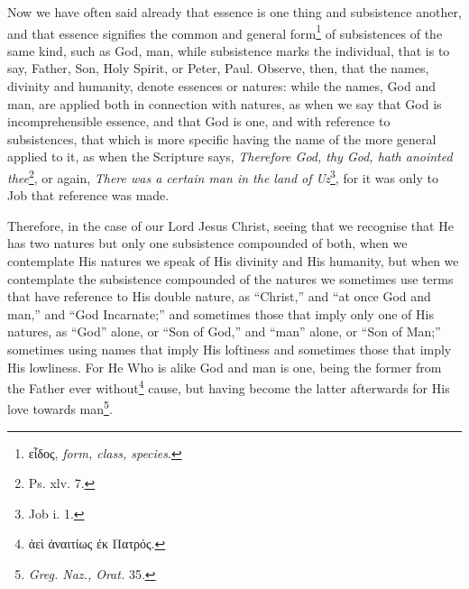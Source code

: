 Now we have often said already that essence is one thing and subsistence another, and that essence signifies the common and general form\footnote{\textgreek{εἶδος}, \emph{form, class, species}.} of subsistences of the same kind, such as God, man, while subsistence marks the individual, that is to say, Father, Son, Holy Spirit, or Peter, Paul. Observe, then, that the names, divinity and humanity, denote essences or natures: while the names, God and man, are applied both in connection with natures, as when we say that God is incomprehensible essence, and that God is one, and with reference to subsistences, that which is more specific having the name of the more general applied to it, as when the Scripture says, \emph{Therefore God, thy God, hath anointed thee}\footnote{Ps. xlv. 7.}, or again, \emph{There was a certain man in the land of Uz}\footnote{Job i. 1.}, for it was only to Job that reference was made.

Therefore, in the case of our Lord Jesus Christ, seeing that we recognise that He has two natures but only one subsistence compounded of both, when we contemplate His natures we speak of His divinity and His humanity, but when we contemplate the subsistence compounded of the natures we sometimes use terms that have reference to His double nature, as “Christ,” and “at once God and man,” and “God Incarnate;” and sometimes those that imply only one of His natures, as “God” alone, or “Son of God,” and “man” alone, or “Son of Man;” sometimes using names that imply His loftiness and sometimes those that imply His lowliness. For He Who is alike God and man is one, being the former from the Father ever without\footnote{\textgreek{ἀεὶ ἀναιτίως ἐκ Πατρός}.} cause, but having become the latter afterwards for His love towards man\footnote{\emph{Greg. Naz., Orat. }35.}.

